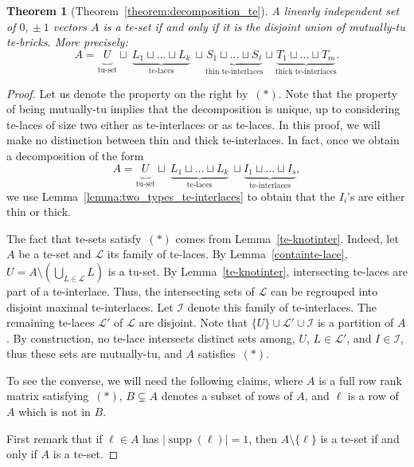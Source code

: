 \documentclass[11pt,a4paper]{amsart}
\renewcommand*{\geq}{\geqslant}
\theoremstyle{plain}
\newtheorem{theorem}{Theorem}[section]%
\theoremstyle{definition}
\newcommand{\cal}[1]{\mathcal{#1}}
\DeclareMathOperator{\supp}{supp}
\renewcommand{\cal}[1]{\mathcal{#1}}
\begin{document}
\begin{theorem}[{Theorem~\ref{theorem:decomposition_te}}]\label{theorem:decomposition_te_full}
A linearly independent set of $0,\!\pm1$ vectors $A$ is a te-set if and only if it is the disjoint union of mutually-tu te-bricks. More precisely:
$$A = \underbrace{U_{}}_{\text{tu-set}} \sqcup~\underbrace{L_1\sqcup \dots \sqcup L_k}_{\text{te-laces}}~\sqcup \underbrace{S_1\sqcup \dots\sqcup S_\ell}_{\text{thin te-interlaces}}\sqcup \underbrace{T_1\sqcup \dots\sqcup T_m}_{\text{thick te-interlaces}}\!\!.$$
\end{theorem}
\begin{proof}
Let us denote the property on the right by~$(\ast)$.
Note that the property of being mutually-tu implies that the decomposition is unique, up to considering te-laces of size two either as te-interlaces or as te-laces.
In this proof, we will make no distinction between thin and thick te-interlaces. In fact, once we obtain a decomposition of the form 
$$A = \underbrace{U_{}}_{\text{tu-set}} \sqcup~\underbrace{L_1\sqcup \dots \sqcup L_k}_{\text{te-laces}}~\sqcup \underbrace{I_1\sqcup \dots\sqcup I_s}_{\text{te-interlaces}}\!\!,$$
we use Lemma~\ref{lemma:two_types_te-interlaces} to obtain that the $I_i$'s are either thin or thick.
\medskip

The fact that te-sets satisfy~$(\ast)$ comes from Lemma~\ref{te-knotinter}.
Indeed, let $A$ be a te-set and $\cal L$ its family of te-laces. 
By Lemma~\ref{containte-lace}, $U = A\setminus (\bigcup_{L\in\cal L} L)$ is a tu-set.
By Lemma~\ref{te-knotinter}, intersecting te-laces are part of a te-interlace.
Thus, the intersecting sets of $\cal L$ can be regrouped into disjoint maximal te-interlaces.
Let $\cal I$ denote this family of te-interlaces.
The remaining te-laces $\cal L'$ of $\cal L$ are disjoint.
Note that $\{U\}\cup \cal L'\cup \cal I$ is a partition of $A$.
By construction, no te-lace intersects distinct sets among, $U$, $L\in\cal L'$, and $I\in \cal I$, thus these sets are mutually-tu, and $A$ satisfies~$(\ast)$.

\medskip

To see the converse, we will need the following claims, where $A$ is a full row rank matrix satisfying~$(\ast)$, $B\subsetneq A$ denotes a subset of rows of $A$, and $\ell$ is a row of $A$ which is not in $B$.

First remark that if $\ell\in A$ has $|\supp(\ell)|=1$, then $A\setminus\{\ell\}$ is a te-set if and only if $A$ is a te-set.


\end{proof}
\end{document}
